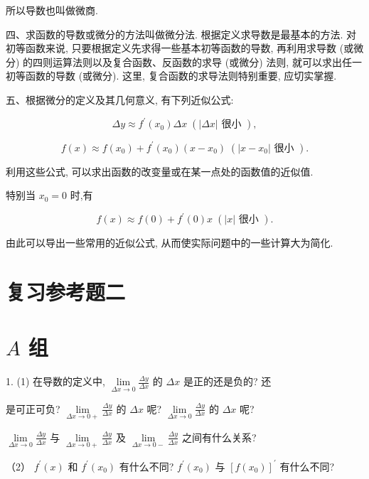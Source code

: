 \documentclass[10pt]{article}
\begin{document}
所以导数也叫做微商.

四、求函数的导数或微分的方法叫做微分法. 根据定义求导数是最基本的方法. 对初等函数来说, 只要根据定义先求得一些基本初等函数的导数, 再利用求导数 (或微分) 的四则运算法则以及复合函数、反函数的求导 (或微分) 法则, 就可以求出任一初等函数的导数 (或微分). 这里, 复合函数的求导法则特别重要, 应切实掌握.

五、根据微分的定义及其几何意义, 有下列近似公式:

\[
{\Delta y} \approx {f}^{\prime }\left( {x}_{0}\right) {\Delta x}\;\left( {\left| {\Delta x}\right| \text{ 很小 }}\right) ,
\]

\[
f\left( x\right) \approx f\left( {x}_{0}\right) + {f}^{\prime }\left( {x}_{0}\right) \left( {x - {x}_{0}}\right) \;\left( {\left| {x - {x}_{0}}\right| \text{ 很小 }}\right) .
\]

利用这些公式, 可以求出函数的改变量或在某一点处的函数值的近似值.

特别当 \({x}_{0} = 0\) 时,有

\[
f\left( x\right) \approx f\left( 0\right) + {f}^{\prime }\left( 0\right) x\;\left( {\left| x\right| \text{ 很小 }}\right) .
\]

由此可以导出一些常用的近似公式, 从而使实际问题中的一些计算大为简化.

\section*{复习参考题二}

\section*{\(A\) 组}

1. (1) 在导数的定义中, \(\mathop{\lim }\limits_{{{\Delta x} \rightarrow 0}}\frac{\Delta y}{\Delta x}\) 的 \({\Delta x}\) 是正的还是负的? 还

是可正可负? \(\mathop{\lim }\limits_{{{\Delta x} \rightarrow 0 + }}\frac{\Delta y}{\Delta x}\) 的 \({\Delta x}\) 呢? \(\mathop{\lim }\limits_{{{\Delta x} \rightarrow 0}}\frac{\Delta y}{\Delta x}\) 的 \({\Delta x}\) 呢?

\(\mathop{\lim }\limits_{{{\Delta x} \rightarrow 0}}\frac{\Delta y}{\Delta x}\) 与 \(\mathop{\lim }\limits_{{{\Delta x} \rightarrow 0 + }}\frac{\Delta y}{\Delta x}\) 及 \(\mathop{\lim }\limits_{{{\Delta x} \rightarrow 0 - }}\frac{\Delta y}{\Delta x}\) 之间有什么关系?

（2） \({f}^{\prime }\left( x\right)\) 和 \({f}^{\prime }\left( {x}_{0}\right)\) 有什么不同? \({f}^{\prime }\left( {x}_{0}\right)\) 与 \({\left\lbrack f\left( {x}_{0}\right) \right\rbrack }^{\prime }\) 有什么不同?
\end{document}
